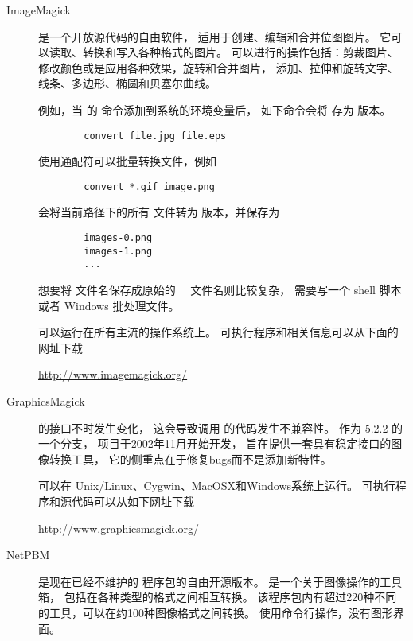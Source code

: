 \begin{description}
	\item[ImageMagick] 
	
	 是一个开放源代码的自由软件，
	适用于创建、编辑和合并位图图片。
	它可以读取、转换和写入各种格式的图片。
	可以进行的操作包括：剪裁图片、修改颜色或是应用各种效果，旋转和合并图片，
	添加、拉伸和旋转文字、线条、多边形、椭圆和贝塞尔曲线。
	
	例如，当  的  命令添加到系统的环境变量后，
	如下命令会将  存为  版本。
\begin{verbatim}
		convert file.jpg file.eps
\end{verbatim}
	
	使用通配符可以批量转换文件，例如
\begin{verbatim}
		convert *.gif image.png
\end{verbatim}
	会将当前路径下的所有  文件转为  版本，并保存为
\begin{verbatim}
		images-0.png
		images-1.png
		...
\end{verbatim}
	想要将  文件名保存成原始的　 文件名则比较复杂，
	需要写一个 shell 脚本或者 Windows 批处理文件。
	
	 可以运行在所有主流的操作系统上。
	可执行程序和相关信息可以从下面的网址下载
	\begin{center}
		\url{http://www.imagemagick.org/}
	\end{center}
	
	\item[GraphicsMagick]
	 的接口不时发生变化，
	这会导致调用  的代码发生不兼容性。
	作为  5.2.2 的一个分支，
	 项目于2002年11月开始开发，
	旨在提供一套具有稳定接口的图像转换工具，
	它的侧重点在于修复bugs而不是添加新特性。
	
	 可以在 Unix/Linux、Cygwin、MacOSX和Windows系统上运行。
	可执行程序和源代码可以从如下网址下载
	\begin{center}
		\url{http://www.graphicsmagick.org/}
	\end{center}
	
	\item[NetPBM]
	 是现在已经不维护的  程序包的自由开源版本。
	 是一个关于图像操作的工具箱，
	包括在各种类型的格式之间相互转换。
	该程序包内有超过220种不同的工具，可以在约100种图像格式之间转换。
	 使用命令行操作，没有图形界面。
	

\end{description}

